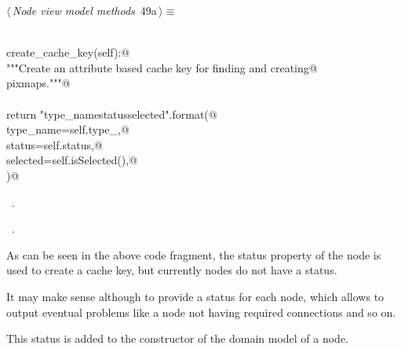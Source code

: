\documentclass[
    a4paper,      %
    10pt,         %
    openright,    %
    notitlepage,  %
    parskip=half, %
]{scrreprt}       %
\theoremstyle{definition}                    %
\begin{document}
\begin{flushleft} \small
\begin{minipage}{\linewidth}\label{scrap66}\raggedright\small
{} $\langle\,${\itshape Node view model methods}\nobreak\ {\footnotesize {49a}}$\,\rangle\equiv$
\vspace{-1exm}
\begin{list}{}{} \item
\mbox{}\lstinline@@\\
\mbox{}\lstinline@def create_cache_key(self):@\\
\mbox{}\lstinline@    """Create an attribute based cache key for finding and creating@\\
\mbox{}\lstinline@    pixmaps."""@\\
\mbox{}\lstinline@@\\
\mbox{}\lstinline@    return "{type_name}{status}{selected}".format(@\\
\mbox{}\lstinline@        type_name=self.type_,@\\
\mbox{}\lstinline@        status=self.status,@\\
\mbox{}\lstinline@        selected=self.isSelected(),@\\
\mbox{}\lstinline@    )@\\
\mbox{}\lstinline@@{\NWsep}
\end{list}
\vspace{-1.5ex}
\footnotesize
\begin{list}{}{\setlength{\itemsep}{-\parsep}\setlength{\itemindent}{-\leftmargin}}
\item \NWtxtMacroDefBy\ .
\item \NWtxtMacroRefIn\ .

\item{}
\end{list}
\end{minipage}\vspace{4ex}
\end{flushleft}
As can be seen in the above code fragment, the status property of the node is
used to create a cache key, but currently nodes do not have a status.

It may make sense although to provide a status for each node, which allows to
output eventual problems like a node not having required connections and so on.

This status is added to the constructor of the domain model of a node.
\end{document}
